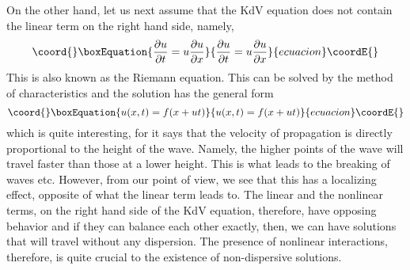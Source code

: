 \documentclass[a4paper,11pt]{article}
\begin{document}
On the other hand, let us next assume that the KdV equation does not
contain  the linear term on the right hand side, namely,
\begin{equation}\coord{}\boxEquation{
{\partial u\over \partial t} = u {\partial u\over \partial x}
}{
{\partial u\over \partial t} = u {\partial u\over \partial x}
}{ecuacion}\coordE{}\end{equation}
This is also known as the Riemann equation. This can be solved by the
method of characteristics and the solution has the general form
\begin{equation}\coord{}\boxEquation{
u(x,t) = f(x + u t)
}{
u(x,t) = f(x + u t)
}{ecuacion}\coordE{}\end{equation}
which is quite interesting, for it says that the velocity of
propagation is directly proportional to the height of the
wave. Namely, the higher points of the wave will travel faster than
those at a lower height. This is what leads to the breaking of waves
etc. However, from our point of view, we see that this has a
localizing effect,  opposite of  what the linear
term leads to. The linear and the nonlinear terms, on the right hand
side of the KdV equation, therefore, have opposing behavior and if
they can balance each other exactly, then, we can have solutions that
will travel without any dispersion. The presence of nonlinear
interactions, therefore, is quite crucial to the existence of
non-dispersive solutions.
\end{document}
